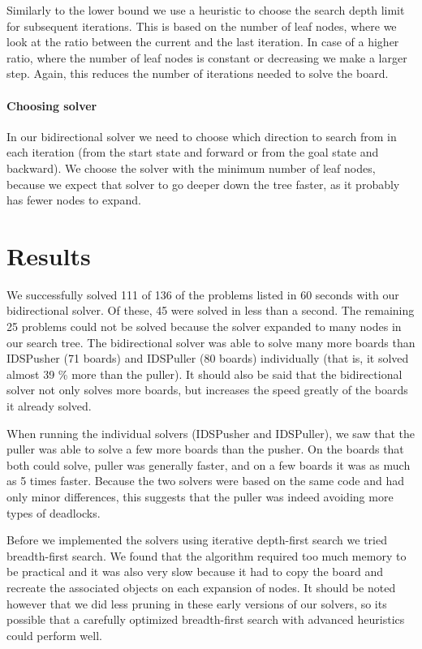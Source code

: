 \documentclass[a4paper,11pt]{article}
\renewcommand{\*}[0]{\cdot}
\begin{document}
Similarly to the lower bound we use a heuristic to choose the search depth limit
for subsequent iterations. This is based on the number of leaf nodes, where we
look at the ratio between the current and the last iteration. In case of a
higher ratio, where the number of leaf nodes is constant or decreasing we make a
larger step. Again, this reduces the number of iterations needed to solve the
board.

\subsection{Choosing solver}

In our bidirectional solver we need to choose which direction to search from in
each iteration (from the start state and forward or from the goal state and
backward). We choose the solver with the minimum number of leaf nodes, because
we expect that solver to go deeper down the tree faster, as it probably has
fewer nodes to expand.

\part*{Results}


We successfully solved 111 of 136 of the problems listed in 60 seconds with our
bidirectional solver. Of these, 45 were solved in less than a second. The
remaining 25 problems could not be solved because the solver expanded to many
nodes in our search tree. The bidirectional solver was able to solve many more
boards than IDSPusher (71 boards) and IDSPuller (80 boards) individually (that
is, it solved almost 39 \% more than the puller). It should also be said that
the bidirectional solver not only solves more boards, but increases the speed
greatly of the boards it already solved.

When running the individual solvers (IDSPusher and IDSPuller), we saw that the
puller was able to solve a few more boards than the pusher. On the boards that
both could solve, puller was generally faster, and on a few boards it was as
much as 5 times faster. Because the two solvers were based on the same code and
had only minor differences, this suggests that the puller was indeed avoiding
more types of deadlocks.

Before we implemented the solvers using iterative depth-first search we tried
breadth-first search. We found that the algorithm required too much memory to be
practical and it was also very slow because it had to copy the board and
recreate the associated objects on each expansion of nodes. It should be noted
however that we did less pruning in these early versions of our solvers, so its
possible that a carefully optimized breadth-first search with advanced
heuristics could perform well.
\end{document}
